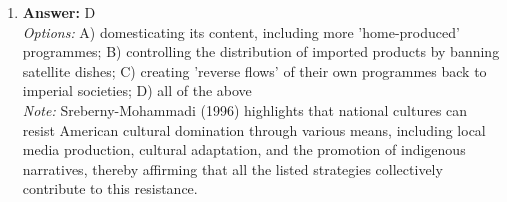 \documentclass[12pt]{article}
\begin{document}
\begin{enumerate}[label=\arabic*.]
\\ \textit{Options:} A) the state's power can be exercised through several different administrative structures; B) the ruling elite is composed of people from various class backgrounds; C) political parties must compete for the votes of 'consumers' in the electorate; D) there is a close alignment between class background and party preference
\\ \textit{Note:} Pluralist theories emphasize that political parties operate in a competitive environment where they must appeal to the preferences and interests of voters, likening the electorate to consumers who make choices based on the offerings of various parties.
\item \textbf{Answer:} D
\\ \textit{Options:} A) domesticating its content, including more 'home-produced' programmes; B) controlling the distribution of imported products by banning satellite dishes; C) creating 'reverse flows' of their own programmes back to imperial societies; D) all of the above
\\ \textit{Note:} Sreberny-Mohammadi (1996) highlights that national cultures can resist American cultural domination through various means, including local media production, cultural adaptation, and the promotion of indigenous narratives, thereby affirming that all the listed strategies collectively contribute to this resistance.
\end{enumerate}
\end{document}
